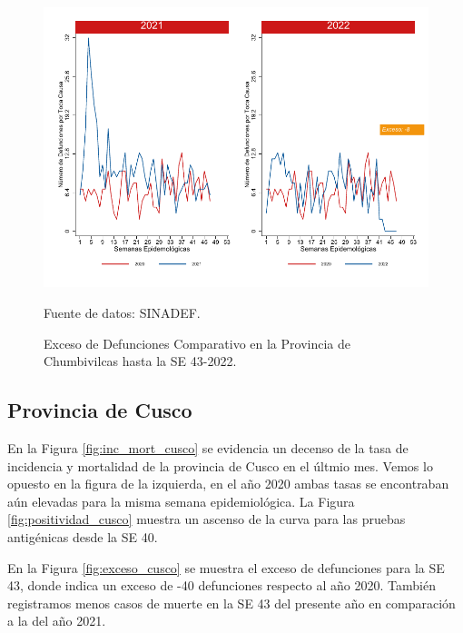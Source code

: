 \documentclass[12pt,a4paper,openany]{book}
\begin{document}
	\begin{figure}[h]
		\caption{Exceso de Defunciones Comparativo en la Provincia de Chumbivilcas hasta la SE 43-2022.}\label{fig:exceso_chumbivilcas}
		\begin{center}
			\includegraphics[width=0.7\linewidth]{../figuras/exceso_6.pdf}
		\end{center}
		{\footnotesize {Fuente de datos: SINADEF.}}
	\end{figure}
	
	\clearpage
	
	\subsection*{Provincia de Cusco}
	\noindent En la Figura \ref{fig:inc_mort_cusco} se evidencia un decenso de la tasa de incidencia y mortalidad de la provincia de Cusco en el últmio mes. Vemos lo opuesto en la figura de la izquierda, en el año 2020 ambas tasas se encontraban aún elevadas para la misma semana epidemiológica.
	\noindent La  Figura \ref{fig:positividad_cusco} muestra un ascenso de la curva para las pruebas antigénicas desde la SE 40.
	
	En la Figura \ref{fig:exceso_cusco} se muestra el exceso de defunciones para la SE 43, donde indica un exceso de -40 defunciones respecto al año 2020. También registramos menos casos de muerte en la SE 43 del presente año en comparación a la del año 2021.
	
\end{document}
